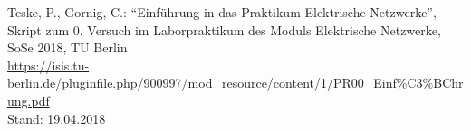 %
\begin{sloppy}
\begin{small}
\begin{onehalfspacing}
  \begin{thebibliography}{--------------------} %
    Teske, P., Gornig, C.: "`Einführung in das Praktikum Elektrische Netzwerke"', Skript zum 0. Versuch im Laborpraktikum des Moduls Elektrische Netzwerke, SoSe 2018, TU Berlin\\
    \url{https://isis.tu-berlin.de/pluginfile.php/900997/mod_resource/content/1/PR00_Einf\%C3\%BChrung.pdf}\\
    Stand: 19.04.2018
%
%
  \end{thebibliography}
\end{onehalfspacing}
\end{small}
\end{sloppy}

